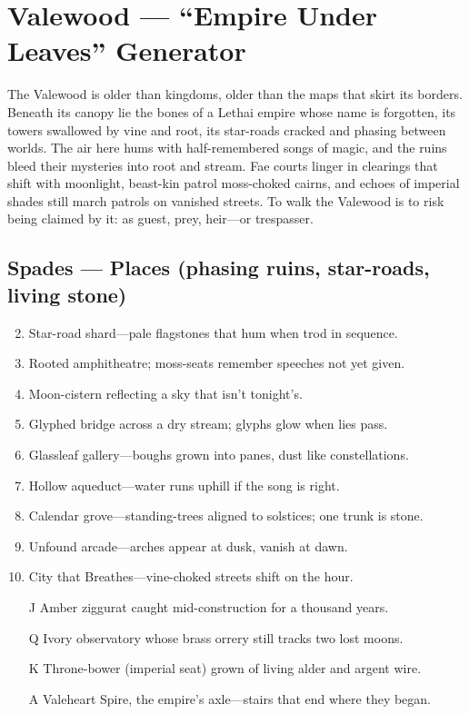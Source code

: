 \section{Valewood --- ``Empire Under Leaves'' Generator}
\label{chap:valewood}

The Valewood is older than kingdoms, older than the maps that skirt its borders. Beneath its canopy lie the bones of a Lethai empire whose name is forgotten, its towers swallowed by vine and root, its star-roads cracked and phasing between worlds. The air here hums with half-remembered songs of magic, and the ruins bleed their mysteries into root and stream. Fae courts linger in clearings that shift with moonlight, beast-kin patrol moss-choked cairns, and echoes of imperial shades still march patrols on vanished streets. To walk the Valewood is to risk being claimed by it: as guest, prey, heir—or trespasser.

\subsection*{Spades --- Places (phasing ruins, star-roads, living stone)}
\label{sec:valewood-places}
\begin{enumerate}
\setcounter{enumi}{1}
\item Star-road shard---pale flagstones that hum when trod in sequence.
\item Rooted amphitheatre; moss-seats remember speeches not yet given.
\item Moon-cistern reflecting a sky that isn't tonight's.
\item Glyphed bridge across a dry stream; glyphs glow when lies pass.
\item Glassleaf gallery---boughs grown into panes, dust like constellations.
\item Hollow aqueduct---water runs uphill if the song is right.
\item Calendar grove---standing-trees aligned to solstices; one trunk is stone.
\item Unfound arcade---arches appear at dusk, vanish at dawn.
\item City that Breathes---vine-choked streets shift on the hour.
\item[J] Amber ziggurat caught mid-construction for a thousand years.
\item[Q] Ivory observatory whose brass orrery still tracks two lost moons.
\item[K] Throne-bower (imperial seat) grown of living alder and argent wire.
\item[A] Valeheart Spire, the empire's axle---stairs that end where they began.
\end{enumerate}

